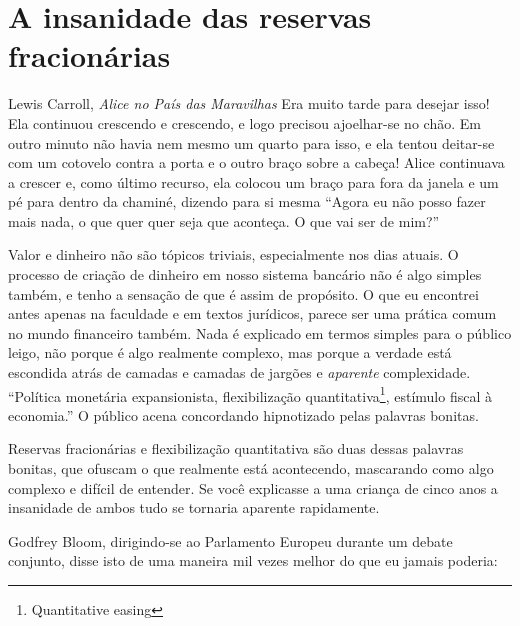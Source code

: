 \chapter{A insanidade das reservas fracionárias}
\label{les:13}

\begin{chapquote}{Lewis Carroll, \textit{Alice no País das Maravilhas}}
Era muito tarde para desejar isso! Ela continuou crescendo e crescendo, e logo precisou ajoelhar-se no chão. Em outro minuto não havia nem mesmo um quarto para isso, e ela tentou deitar-se com um cotovelo contra a porta e o outro braço sobre a cabeça! Alice continuava a crescer e, como último recurso, ela colocou um braço para fora da janela e um pé para dentro da chaminé, dizendo para si mesma 
\enquote{Agora eu não posso fazer mais nada, o que quer quer seja que aconteça. O que vai ser de mim?}
\end{chapquote}

Valor e dinheiro não são tópicos triviais, especialmente nos dias atuais. O processo de criação de dinheiro em nosso sistema bancário não é algo simples também, e tenho a sensação de que é assim de propósito. O que eu encontrei antes apenas na faculdade e em textos jurídicos, parece ser uma prática comum no mundo financeiro também. Nada é explicado em termos simples para o público leigo, não porque é algo realmente complexo, mas porque a verdade está escondida atrás de camadas e camadas de jargões e \textit{aparente} complexidade. \enquote{Política monetária expansionista, flexibilização quantitativa\footnote{Quantitative easing}, estímulo fiscal à economia.} O público acena concordando hipnotizado pelas palavras bonitas.

Reservas fracionárias e flexibilização quantitativa são duas dessas palavras bonitas, que ofuscam o que realmente está acontecendo, mascarando como algo complexo e difícil de entender. Se você explicasse a uma criança de cinco anos a insanidade de ambos tudo se tornaria aparente rapidamente.

Godfrey Bloom, dirigindo-se ao Parlamento Europeu durante um debate conjunto, disse isto de uma maneira mil vezes melhor do que eu jamais poderia:

